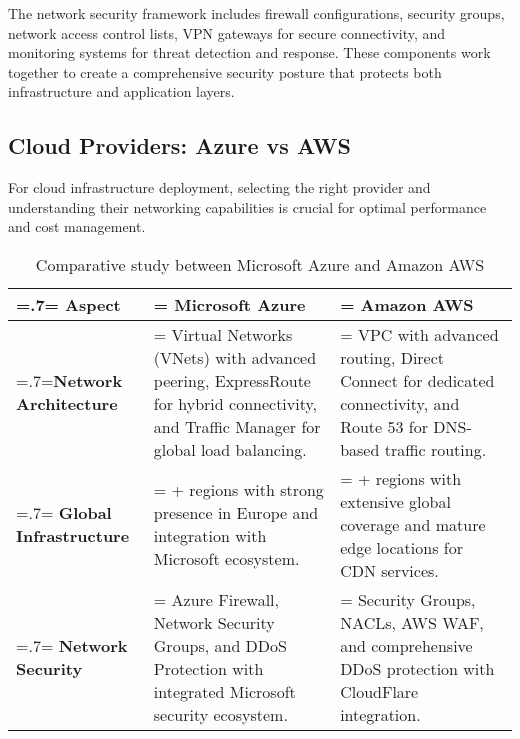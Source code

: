 The network security framework includes firewall configurations, security groups, network access control lists, VPN gateways for secure connectivity, and monitoring systems for threat detection and response. These components work together to create a comprehensive security posture that protects both infrastructure and application layers.

\subsection{Cloud Providers: Azure vs AWS}
For cloud infrastructure deployment, selecting the right provider and understanding their networking capabilities is crucial for optimal performance and cost management.

\begin{table}[H]
    \renewcommand{\arraystretch}{1.5}%
    \caption{Comparative study between Microsoft Azure and Amazon AWS}
    \centering
    \medskip
    \begin{tabularx}{1\textwidth} {
            | >{\hsize=.7\hsize\linewidth=\hsize\centering\arraybackslash}X
            | >{\hsize=1.15\hsize\linewidth=\hsize\justifying\arraybackslash}X
            | >{\hsize=1.15\hsize\linewidth=\hsize\justifying\arraybackslash}X |}
        \hline
        \rowcolor{primary} \textbf {Aspect} & \textbf {Microsoft Azure}                                                                                                                      & \textbf {Amazon AWS}                                                                                                        \\
        \hline
        \textbf {Network Architecture}      & \noindent Virtual Networks (VNets) with advanced peering, ExpressRoute for hybrid connectivity, and Traffic Manager for global load balancing. & \noindent VPC with advanced routing, Direct Connect for dedicated connectivity, and Route 53 for DNS-based traffic routing. \\
        \hline
        \textbf {Global Infrastructure}     & \noindent 60+ regions with strong presence in Europe and integration with Microsoft ecosystem.                                                 & \noindent 80+ regions with extensive global coverage and mature edge locations for CDN services.                            \\
        \hline
        \textbf {Network Security}          & \noindent Azure Firewall, Network Security Groups, and DDoS Protection with integrated Microsoft security ecosystem.                           & \noindent Security Groups, NACLs, AWS WAF, and comprehensive DDoS protection with CloudFlare integration.                   \\

\end{tabularx}
\end{table}

